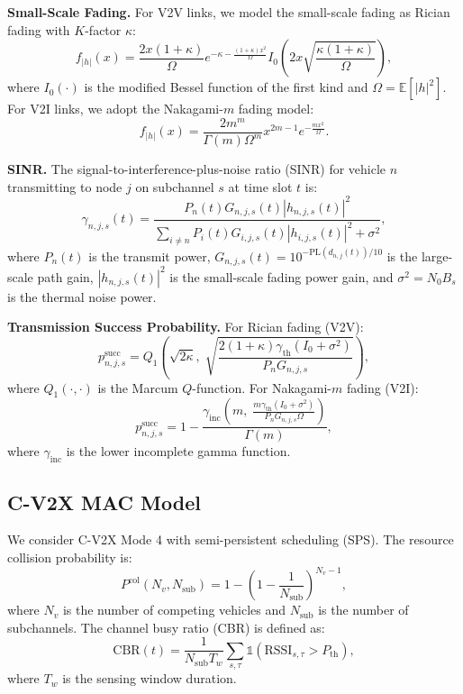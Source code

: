 \documentclass[journal]{IEEEtran}
\begin{document}
\textbf{Small-Scale Fading.} For V2V links, we model the small-scale fading as Rician fading with $K$-factor $\kappa$:
\begin{equation} \label{eq:rician}
f_{|h|}(x) = \frac{2x(1+\kappa)}{\Omega} e^{-\kappa - \frac{(1+\kappa)x^2}{\Omega}} I_0\left(2x\sqrt{\frac{\kappa(1+\kappa)}{\Omega}}\right),
\end{equation}
where $I_0(\cdot)$ is the modified Bessel function of the first kind and $\Omega = \mathbb{E}[|h|^2]$. For V2I links, we adopt the Nakagami-$m$ fading model:
\begin{equation} \label{eq:nakagami}
f_{|h|}(x) = \frac{2m^m}{\Gamma(m)\Omega^m} x^{2m-1} e^{-\frac{mx^2}{\Omega}}.
\end{equation}

\textbf{SINR.} The signal-to-interference-plus-noise ratio (SINR) for vehicle $n$ transmitting to node $j$ on subchannel $s$ at time slot $t$ is:
\begin{equation} \label{eq:sinr}
\gamma_{n,j,s}(t) = \frac{P_n(t) G_{n,j,s}(t) |h_{n,j,s}(t)|^2}{\sum_{i \neq n} P_i(t) G_{i,j,s}(t) |h_{i,j,s}(t)|^2 + \sigma^2},
\end{equation}
where $P_n(t)$ is the transmit power, $G_{n,j,s}(t) = 10^{-\text{PL}(d_{n,j}(t))/10}$ is the large-scale path gain, $|h_{n,j,s}(t)|^2$ is the small-scale fading power gain, and $\sigma^2 = N_0 B_s$ is the thermal noise power.

\textbf{Transmission Success Probability.} For Rician fading (V2V):
\begin{equation} \label{eq:tx_succ_rician}
p_{n,j,s}^{\text{succ}} = Q_1\left(\sqrt{2\kappa},\; \sqrt{\frac{2(1+\kappa)\gamma_{\text{th}}(I_0 + \sigma^2)}{P_n G_{n,j,s}}}\right),
\end{equation}
where $Q_1(\cdot,\cdot)$ is the Marcum $Q$-function. For Nakagami-$m$ fading (V2I):
\begin{equation} \label{eq:tx_succ_nakagami}
p_{n,j,s}^{\text{succ}} = 1 - \frac{\gamma_{\text{inc}}\left(m,\; \frac{m \gamma_{\text{th}}(I_0 + \sigma^2)}{P_n G_{n,j,s} \Omega}\right)}{\Gamma(m)},
\end{equation}
where $\gamma_{\text{inc}}$ is the lower incomplete gamma function.

\subsection{C-V2X MAC Model} \label{subsec:mac}

We consider C-V2X Mode 4 with semi-persistent scheduling (SPS). The resource collision probability is:
\begin{equation} \label{eq:collision}
P^{\text{col}}(N_v, N_{\text{sub}}) = 1 - \left(1 - \frac{1}{N_{\text{sub}}}\right)^{N_v - 1},
\end{equation}
where $N_v$ is the number of competing vehicles and $N_{\text{sub}}$ is the number of subchannels. The channel busy ratio (CBR) is defined as:
\begin{equation} \label{eq:cbr}
\text{CBR}(t) = \frac{1}{N_{\text{sub}} T_w} \sum_{s,\tau} \mathbb{1}(\text{RSSI}_{s,\tau} > P_{\text{th}}),
\end{equation}
where $T_w$ is the sensing window duration.
\end{document}
